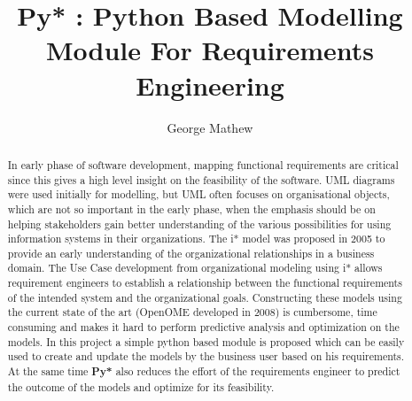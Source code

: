 \documentclass[
journal=jacsat, %
manuscript=article]{achemso}
\author{George Mathew}
\affiliation[North Carolina State University]
{Department of Computer Science, North Carolina State University}
\title[\texttt{Py*} abstract]
{Py* : Python Based Modelling Module For Requirements Engineering}
\begin{document}
\begin{abstract}
In early phase of software development, mapping functional requirements are critical since this
gives a high level insight on the feasibility of the software. UML diagrams were used initially
for modelling, but UML often focuses on organisational objects, which are not
so important in the early phase, when the emphasis should be on helping stakeholders gain better
understanding of the various possibilities for using information systems in their organizations.
The i* model was proposed in 2005 to provide an early understanding of the organizational
relationships in a business domain. The Use Case development from organizational modeling using
i* allows requirement engineers to establish a relationship between the functional requirements
of the intended system and the organizational goals. Constructing these models using the current state of the art (OpenOME developed in 2008) is cumbersome, time consuming and makes it hard to perform predictive analysis and optimization on the models. In this project a simple python based module is proposed which can be easily used to create and update the models by the business user based on his requirements. At the same time \textbf{Py*} also reduces the effort of the requirements engineer to predict the outcome of the models and optimize for its feasibility.
\end{abstract}
\end{document}
